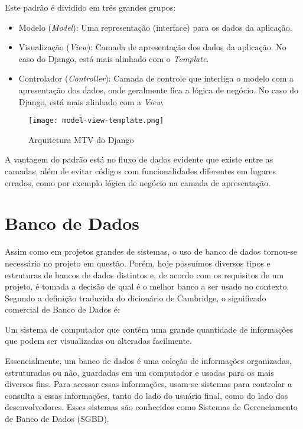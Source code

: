 Este padrão é dividido em três grandes grupos\cite{thedjangobook2018}:

\begin{itemize}
    \item Modelo (\textit{Model}): Uma representação (interface) para os dados da aplicação.
    \item Visualização (\textit{View}): Camada de apresentação dos dados da aplicação. No caso do Django, está mais alinhado com o \textit{Template}.
    \item Controlador (\textit{Controller}): Camada de controle que interliga o modelo com a apresentação dos dados, onde geralmente fica a lógica de negócio. No caso do Django, está mais alinhado com a \textit{View}.
\end{itemize}

\begin{figure}[H]
    \centering
    \texttt{[image: model-view-template.png]}
    \caption{Arquitetura MTV do Django\cite{codelv2018}}
    \label{fig:mtv-django}
\end{figure}

A vantagem do padrão está no fluxo de dados evidente que existe entre as camadas, além de evitar códigos com funcionalidades diferentes em lugares errados, como por exemplo lógica de negócio na camada de apresentação.

\section{Banco de Dados}

Assim como em projetos grandes de sistemas, o uso de banco de dados tornou-se necessário no projeto em questão. Porém, hoje possuímos diversos tipos e estruturas de bancos de dados distintos e, de acordo com os requisitos de um projeto, é tomada a decisão de qual é o melhor banco a ser usado no contexto. Segundo a definição traduzida do dicionário de Cambridge\cite{cambridgeuniversitypress2018}, o significado comercial de Banco de Dados é:

\begin{citacaoLonga}
Um sistema de computador que contém uma grande quantidade de informações que podem ser visualizadas ou alteradas facilmente.
\end{citacaoLonga}

Essencialmente, um banco de dados é uma coleção de informações organizadas, estruturadas ou não, guardadas em um computador e usadas para os mais diversos fins. Para acessar essas informações, usam-se sistemas para controlar a consulta a essas informações, tanto do lado do usuário final, como do lado dos desenvolvedores. Esses sistemas são conhecidos como Sistemas de Gerenciamento de Banco de Dados (SGBD)\cite{devmedia2014}.

